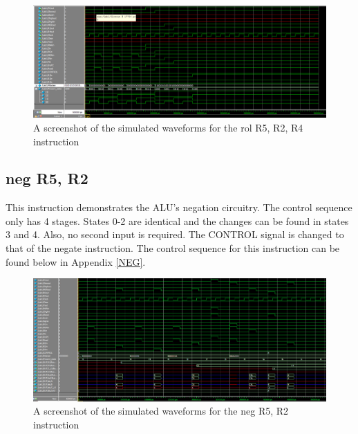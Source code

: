 \documentclass{article}
\begin{document}
    \begin{figure}[h!]
        \begin{center}
            \includegraphics[width=15cm]{rol}
            \caption{A screenshot of the simulated waveforms for the rol R5, R2, R4 instruction}
        \end{center}
    \end{figure}

    \subsection{neg R5, R2}
    This instruction demonstrates the ALU's negation circuitry. The control sequence only has 4 stages. States 0-2 are identical and the changes can be found in states 3 and 4. Also, no second input is required. The CONTROL signal is changed to that of the negate instruction. The control sequence for this instruction can be found below in Appendix \ref{NEG}.

    \begin{figure}[h!]
        \begin{center}
            \includegraphics[width=15cm]{NEG_FINAL.png}
            \caption{A screenshot of the simulated waveforms for the neg R5, R2 instruction}
        \end{center}
    \end{figure}
\end{document}

